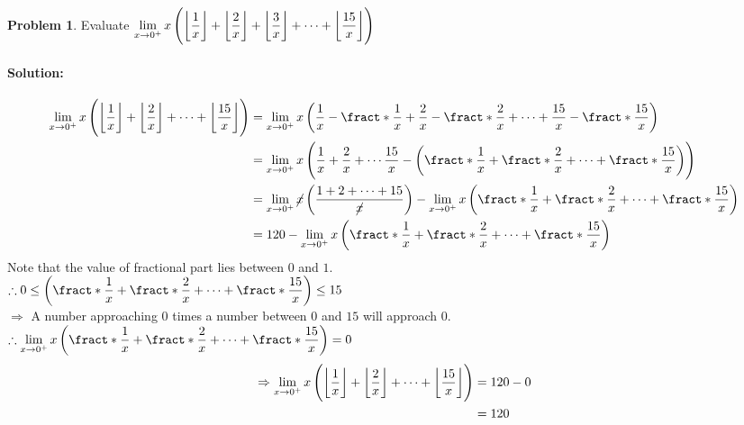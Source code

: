 \documentclass[14]{article}
\DeclarePairedDelimiter\floor{\lfloor}{\rfloor}
\DeclarePairedDelimiter\fract\{\}
\theoremstyle{definition}
\newtheorem{prob}{Problem}
\begin{document}
\begin{prob}
Evaluate $\lim\limits_{x \to 0^+} x\left( \floor*{\dfrac{1}{x}} + \floor*{\dfrac{2}{x}}  + \floor*{\dfrac{3}{x}} + \cdots + \floor*{\dfrac{15}{x}}\right)$
\paragraph{Solution:}
\begin{align*}
\lim\limits_{x \to 0^+} x\left( \floor*{\dfrac{1}{x}} + \floor*{\dfrac{2}{x}} + \cdots + \floor*{\dfrac{15}{x}}\right) &= \lim\limits_{x \to 0^+} x \left( \dfrac{1}{x} - \fract*{\dfrac1x} + \dfrac2x - \fract*{\dfrac2x} + \cdots + \dfrac{15}{x} - \fract*{\dfrac{15}x} \right)\\
&= \lim\limits_{x \to 0^+} x\left( \dfrac1x + \dfrac2x + \cdots \dfrac{15}{x} - \left( \fract*{\dfrac1x} + \fract*{\dfrac2x} + \cdots + \fract*{\dfrac{15}{x}} \right) \right)\\
&= \lim\limits_{x \to 0^+} \cancel x \left( \dfrac{1 + 2  + \cdots + 15}{\cancel x} \right) - \lim\limits_{x \to 0^+} x \left( \fract*{\dfrac1x} + \fract*{\dfrac2x} + \cdots + \fract*{\dfrac{15}{x}} \right)\\
&= 120 - \lim\limits_{x \to 0^+} x \left( \fract*{\dfrac1x} + \fract*{\dfrac2x} + \cdots + \fract*{\dfrac{15}{x}} \right)\\
\end{align*}
Note that the value of fractional part lies between $0$ and $1$.\\
$\therefore 0 \leq \left( \fract*{\dfrac1x} + \fract*{\dfrac2x} + \cdots + \fract*{\dfrac{15}{x}} \right) \leq 15$\\
$\Rightarrow$ A number approaching $0$ times a number between $0$ and $15$ will approach $0$.\\
$\therefore \lim\limits_{x \to 0^+} x \left( \fract*{\dfrac1x} + \fract*{\dfrac2x} + \cdots + \fract*{\dfrac{15}{x}} \right) = 0$
\begin{align*}
\Rightarrow \lim\limits_{x \to 0^+} x\left( \floor*{\dfrac{1}{x}} + \floor*{\dfrac{2}{x}} + \cdots + \floor*{\dfrac{15}{x}}\right) &= 120 -0\\
&= 120
\end{align*}
\end{prob}
\end{document}
